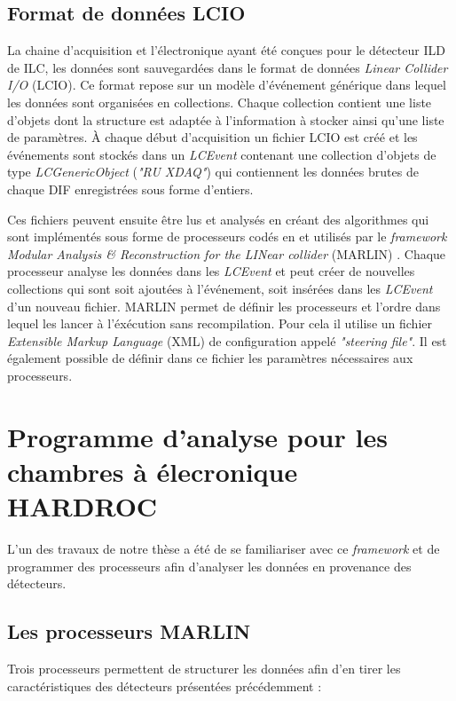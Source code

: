 \subsection{Format de données LCIO}
La chaine d'acquisition et l'électronique ayant été conçues pour le détecteur ILD de ILC, les données sont sauvegardées dans le format de données \textit{Linear Collider I/O} (LCIO)\cite{2003physics6114G}. Ce format repose sur un modèle d'événement générique  dans lequel les données sont organisées en collections. Chaque collection contient une liste d'objets dont la structure est adaptée à l'information à stocker ainsi qu'une liste de paramètres. À chaque début d'acquisition un fichier LCIO est créé et les événements sont stockés dans un \textit{LCEvent} contenant une collection d'objets de type \textit{LCGenericObject} (\textit{"RU XDAQ"}) qui contiennent les données brutes de chaque DIF enregistrées sous forme d'entiers.

Ces fichiers peuvent ensuite être lus et analysés en créant des algorithmes qui sont implémentés sous forme de processeurs codés en \Cpp et utilisés par le \textit{framework Modular Analysis \& Reconstruction for the LINear collider} (MARLIN) \cite{Gaede:2006pj}. Chaque processeur analyse les données dans les \textit{LCEvent} et peut créer de nouvelles collections qui sont soit ajoutées à l'événement, soit insérées dans les \textit{LCEvent} d'un nouveau fichier. MARLIN permet de définir les processeurs et l'ordre dans lequel les lancer à l'éxécution sans recompilation. Pour cela il utilise un fichier \textit{Extensible Markup Language} (XML) de configuration appelé \textit{"steering file"}. Il est également possible de définir dans ce fichier les paramètres nécessaires aux processeurs.

\section{Programme d'analyse pour les chambres à élecronique HARDROC}
L'un des travaux de notre thèse a été de se familiariser avec ce \textit{framework} et de programmer des processeurs afin d'analyser les données en provenance des détecteurs. 

\subsection{Les processeurs MARLIN}
Trois processeurs permettent de structurer les données afin d'en tirer les caractéristiques des détecteurs présentées précédemment :

